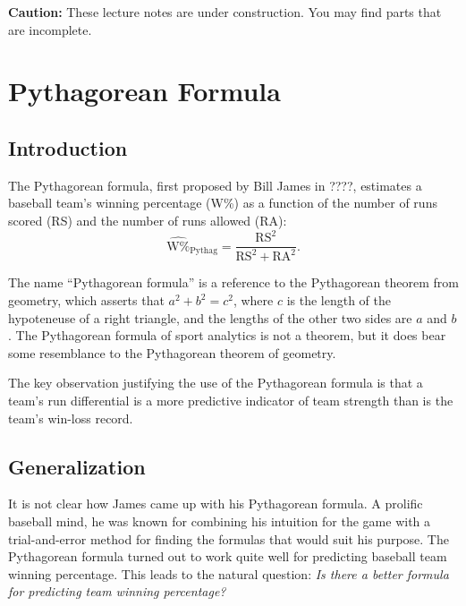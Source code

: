 \documentclass{article}
\begin{document}
  \begin{framed}
    {\bf Caution:} These lecture notes are under construction. You may find parts that are incomplete.
  \end{framed}
  
  \setcounter{section}{1}
  \section{\sc Pythagorean Formula}
  
    \subsection{\sc Introduction}
    
    The Pythagorean formula, first proposed by Bill James in ????, estimates a baseball team's winning percentage (W\%) as a function of the number of runs scored (RS) and the number of runs allowed (RA):
    $$
      \hat{\mbox{W\%}}_{\mbox{Pythag}} = \frac{\mbox{RS}^2}{\mbox{RS}^2 + \mbox{RA}^2}.
    $$
    
    The name ``Pythagorean formula'' is a reference to the Pythagorean theorem from geometry, which asserts that $a^2 + b^2 = c^2$, where $c$ is the length of the hypoteneuse of a right triangle, and the lengths of the other two sides are $a$ and $b$. The Pythagorean formula of sport analytics is not a theorem, but it does bear some resemblance to the Pythagorean theorem of geometry.
    
    The key observation justifying the use of the Pythagorean formula is that a team's run differential is a more predictive indicator of team strength than is the team's win-loss record.
    
    \subsection{\sc Generalization}
    
    It is not clear how James came up with his Pythagorean formula. A prolific baseball mind, he was known for combining his intuition for the game with a trial-and-error method for finding the formulas that would suit his purpose. The Pythagorean formula turned out to work quite well for predicting baseball team winning percentage. This leads to the natural question: {\it Is there a better formula for predicting team winning percentage?}
    
\end{document}
